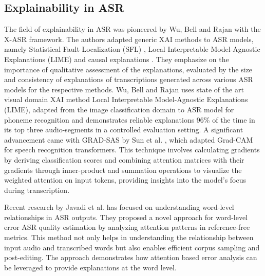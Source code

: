 \documentclass[../report.tex]{subfiles}
\begin{document}
    \subsection{Explainability in ASR}
    The field of explainability in ASR was pioneered by Wu, Bell and Rajan \cite{10094635} with the X-ASR framework. The authors adapted generic XAI methods to ASR models, namely Statistical Fault Localization (SFL) \cite{sun2020explaining}, Local Interpretable Model-Agnostic Explanations (LIME) \cite{ribeiro2016should} and causal explanations \cite{chockler2021explanations}. They emphasize on the importance of qualitative assessment of the explanations, evaluated by the size and consistency of explanations of transcriptions generated across various ASR models for the respective methods. Wu, Bell and Rajan \cite{wu2024can} uses state of the art visual domain XAI method Local Interpretable Model-Agnostic Explanations (LIME), adapted from the image classification domain to ASR model for phoneme recognition and demonstrates reliable explanations 96\% of the time in its top three audio-segments in a controlled evaluation setting.
     A significant advancement came with GRAD-SAS by Sun et al. \cite{10143311}, which adapted Grad-CAM \cite{Selvaraju_2019} for speech recognition transformers. This technique involves calculating gradients by deriving classification scores and combining attention matrices with their gradients through inner-product and summation operations to visualize the weighted attention on input tokens, providing insights into the model's focus during transcription.

    Recent research by Javadi et al. \cite{10669910} has focused on understanding word-level relationships in ASR outputs. They proposed a novel approach for word-level error ASR quality estimation by analyzing attention patterns in reference-free metrics. This method not only helps in understanding the relationship between input audio and transcribed words but also enables efficient corpus sampling and post-editing. The approach demonstrates how attention based error analysis can be leveraged to provide explanations at the word level.
\end{document}
